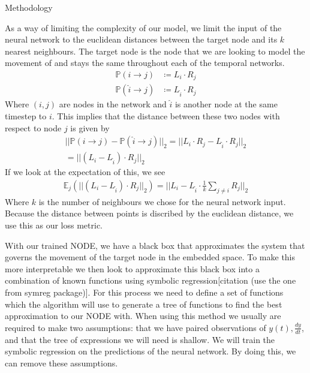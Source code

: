 \documentclass[12pt]{amsart}
\begin{document}
\begin{section}{Methodology}
    
    As a way of limiting the complexity of our model, we limit the input of the neural network to the euclidean distances between the target node and its $k$ nearest neighbours. The target node is the node that we are looking to model the movement of and stays the same throughout each of the temporal networks. 
    \begin{align}
        \mathbb{P}(i\rightarrow j)&\coloneqq L_i \cdot R_j\\
        \mathbb{P}(\hat{i}\rightarrow j)&\coloneqq L_{\hat{i}} \cdot R_j
    \end{align}
    Where $(i,j)$ are nodes in the network and $\hat{i}$ is another node at the same timestep to $i$. This implies that the distance between these two nodes with respect to node $j$ is given by
    \begin{equation}
        \begin{gathered}
            ||\mathbb{P}(i\rightarrow j)-\mathbb{P}(\hat{i}\rightarrow j)||_2 = 
            ||L_i \cdot R_j-L_{\hat{i}} \cdot R_j||_2\\
            =||(L_i -L_{\hat{i}}) \cdot R_j||_2
        \end{gathered}
    \end{equation}
    If we look at the expectation of this, we see
    \begin{equation}
        \begin{gathered}
            \mathbb{E}_j(||(L_i -L_{\hat{i}}) \cdot R_j||_2) = ||L_i -L_{\hat{i}} \cdot \frac{1}{k}\sum_{j\ne i}R_j||_2
        \end{gathered}
    \end{equation}
    Where $k$ is the number of neighbours we chose for the neural network input. Because the distance between points is discribed by the euclidean distance, we use this as our loss metric.

    With our trained NODE, we have a black box that approximates the system that governs the movement of the target node in the embedded space. To make this more interpretable we then look to approximate this black box into a combination of known functions using symbolic regression[citation (use the one from symreg package)]. For this process we need to define a set of functions which the algorithm will use to generate a tree of functions to find the best approximation to our NODE with. When using this method we usually are required to make two assumptions: that we have paired observations of $y(t), \frac{dy}{dt}$, and that the tree of expressions we will need is shallow. We will train the symbolic regression on the predictions of the neural network. By doing this, we can remove these assumptions\cite{kidger2022neural}.
\end{section}
\end{document}
